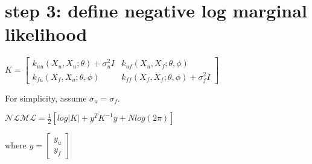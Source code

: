 \documentclass[letterpaper,10pt,english]{sphinxmanual}
\begin{document}
%
\begin{sphinxVerbatim}[commandchars=\\\{\}]
    
     
\end{sphinxVerbatim}


\section{step 3: define negative log marginal likelihood}
\label{\detokenize{notebooks/par_est/par_est:step-3-define-negative-log-marginal-likelihood}}
\(K = \begin{bmatrix} k_{uu}(X_u, X_u; \theta) + \sigma_u^2I & k_{uf}(X_u, X_f; \theta, \phi) \\ k_{fu}(X_f, X_u; \theta, \phi) & k_{ff}(X_f, X_f; \theta, \phi) + \sigma_f^2I \end{bmatrix}\)

For simplicity, assume \(\sigma_u = \sigma_f\).

\(\mathcal{NLML} = \frac{1}{2} \left[ log|K| + y^TK^{-1}y + Nlog(2\pi) \right]\)

where \(y = \begin{bmatrix} y_u \\ y_f \end{bmatrix}\)
\end{document}
